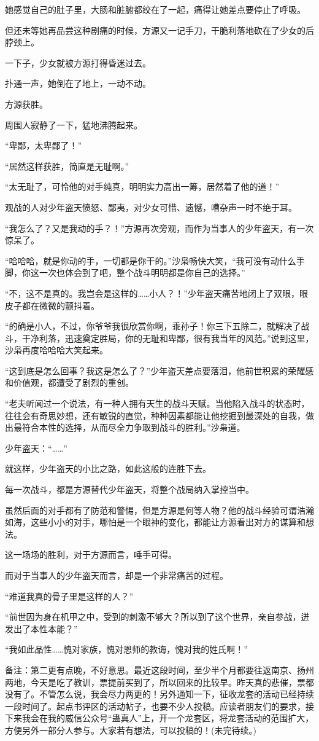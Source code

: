 \begin{this_body}
她感觉自己的肚子里，大肠和脏腑都绞在了一起，痛得让她差点要停止了呼吸。

但还未等她再品尝这种剧痛的时候，方源又一记手刀，干脆利落地砍在了少女的后脖颈上。

一下子，少女就被方源打得昏迷过去。

扑通一声，她倒在了地上，一动不动。

方源获胜。

周围人寂静了一下，猛地沸腾起来。

“卑鄙，太卑鄙了！”

“居然这样获胜，简直是无耻啊。”

“太无耻了，可怜他的对手纯真，明明实力高出一筹，居然着了他的道！”

观战的人对少年盗天愤怒、鄙夷，对少女可惜、遗憾，嘈杂声一时不绝于耳。

“我怎么了？又是我动的手？！”方源再次旁观，而作为当事人的少年盗天，有一次惊呆了。

“哈哈哈，就是你动的手，一切都是你干的。”沙枭畅快大笑，“我可没有动什么手脚，你这一次也体会到了吧，整个战斗明明都是你自己的选择。”

“不，这不是真的。我岂会是这样的……小人？！”少年盗天痛苦地闭上了双眼，眼皮子都在微微的颤抖着。

“的确是小人，不过，你爷爷我很欣赏你啊，乖孙子！你三下五除二，就解决了战斗，干净利落，迅速奠定胜局，你的无耻和卑鄙，很有我当年的风范。”说到这里，沙枭再度哈哈哈大笑起来。

“这到底是怎么回事？我这是怎么了？”少年盗天差点要落泪，他前世积累的荣耀感和价值观，都遭受了剧烈的重创。

“老夫听闻过一个说法，有一种人拥有天生的战斗天赋。当他陷入战斗的状态时，往往会有奇思妙想，还有敏锐的直觉，种种因素都能让他挖掘到最深处的自我，做出最符合本性的选择，从而尽全力争取到战斗的胜利。”沙枭道。

少年盗天：“……”

就这样，少年盗天的小比之路，如此这般的连胜下去。

每一次战斗，都是方源替代少年盗天，将整个战局纳入掌控当中。

虽然后面的对手都有了防范和警惕，但是方源是何等人物？他的战斗经验可谓浩瀚如海，这些小小的对手，哪怕是一个眼神的变化，都能让方源看出对方的谋算和想法。

这一场场的胜利，对于方源而言，唾手可得。

而对于当事人的少年盗天而言，却是一个非常痛苦的过程。

“难道我真的骨子里是这样的人？”

“前世因为身在机甲之中，受到的刺激不够大？所以到了这个世界，亲自参战，迸发出了本性本能？”

“我如此品性……愧对家族，愧对恩师的教诲，愧对我的姓氏啊！”

备注：第二更有点晚，不好意思。最近这段时间，至少半个月都要往返南京、扬州两地，今天是吃了教训，票提前买到了，所以回来的比较早。昨天真的悲催，票都没有了。不管怎么说，我会尽力两更的！另外通知一下，征收龙套的活动已经持续一段时间了。起点书评区的活动帖子，也要不少人投稿。应读者朋友们的要求，接下来我会在我的威信公众号“蛊真人”上，开一个龙套区，将龙套活动的范围扩大，方便另外一部分人参与。大家若有想法，可以投稿的！(未完待续。)

\end{this_body}

